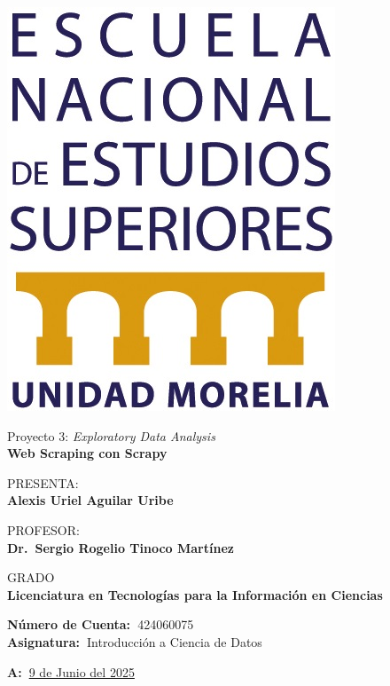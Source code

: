 \documentclass[12pt,a4paper]{article}
\begin{document}
\begin{titlepage}
\begin{minipage}[c]{0.1\textwidth}
        \includegraphics[width=\textwidth]{logo_enes.jpg}
    \end{minipage}
    \vspace{1.5cm}
    
    \centering

    {\large{Proyecto 3: \emph{Exploratory Data Analysis}\\}}
    {\Large\textbf{Web Scraping con Scrapy}}
    \vspace{1cm}

    {{PRESENTA:\\}}
    {\large\textbf{Alexis Uriel Aguilar Uribe}}
    \vspace{0.5cm} 

    {{PROFESOR:\\}}
    {\large\textbf{Dr.\ Sergio Rogelio Tinoco Martínez}}
    \vspace{1cm}

    {{GRADO\\}}
    {\large\textbf{Licenciatura en Tecnologías para la Información en Ciencias}}
    \vspace{1cm}

    \flushleft
    {\textbf{Número de Cuenta:\ }424060075}\\
    {\textbf{Asignatura:\ }Introducción a Ciencia de Datos}
    \vspace{1cm}

    \flushright
    {\textbf{A:\ }\underline{9 de Junio del 2025}}
    \vfill

\end{titlepage}

\newpage
\end{document}
